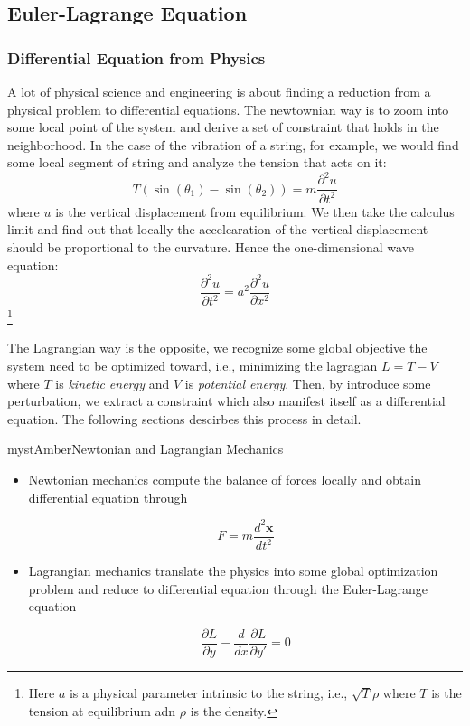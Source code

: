\subsection{Euler-Lagrange Equation}

\subsubsection{Differential Equation from Physics}

A lot of physical science and engineering is about finding a reduction from a physical problem to differential equations. The newtownian way is to zoom into some local point of the system and derive a set of constraint that holds in the neighborhood. In the case of the vibration of a string, for example, we would find some local segment of string and analyze the tension that acts on it:
\begin{equation}
T(\sin(\theta_1)-\sin(\theta_2)) = m\frac{\partial^2 u}{\partial t^2}
\end{equation}
where $u$ is the vertical displacement from equilibrium. We then take the calculus limit and find out that locally the accelearation of the vertical displacement should be proportional to the curvature. Hence the one-dimensional wave equation:
\begin{equation}
\frac{\partial^2 u}{\partial t^2}=a^2 \frac{\partial^2 u}{\partial x^2}
\end{equation}
\footnote{Here $a$ is a physical parameter intrinsic to the string, i.e., $\sqrt{T}{\rho}$ where $T$ is the tension at equilibrium adn $\rho$ is the density.}

The Lagrangian way is the opposite, we recognize some global objective the system need to be optimized toward, i.e., minimizing the lagragian $L=T -V$ where $T$ is \textit{kinetic energy} and $V$ is \textit{potential energy}. Then, by introduce some perturbation, we extract a constraint which also manifest itself as a differential equation. The following sections descirbes this process in detail.

\begin{mystadmonition}{mystAmber}{Newtonian and Lagrangian Mechanics}\begin{itemize}
\item Newtonian mechanics compute the balance of forces locally and obtain differential equation through

\begin{equation}
F=m\frac{d^2\mathbf{x}}{dt^2}
\end{equation}


\item Lagrangian mechanics translate the physics into some global optimization problem  and reduce to differential equation through the Euler-Lagrange equation

\begin{equation}
\frac{\partial L}{\partial y}- \frac{d}{dx}\frac{\partial L}{\partial y'}=0
\end{equation}
\end{itemize}

\end{mystadmonition}
